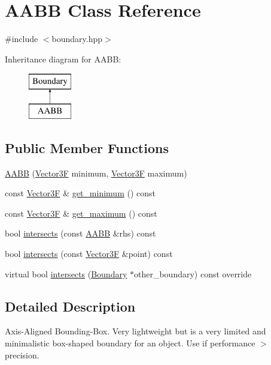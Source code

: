 \hypertarget{class_a_a_b_b}{}\section{A\+A\+BB Class Reference}
\label{class_a_a_b_b}


{\ttfamily \#include $<$boundary.\+hpp$>$}

Inheritance diagram for A\+A\+BB\+:\begin{figure}[H]
\begin{center}
\leavevmode
\includegraphics[height=2.000000cm]{class_a_a_b_b}
\end{center}
\end{figure}
\subsection*{Public Member Functions}
\begin{DoxyCompactItemize}
\item 
\mbox{\hyperlink{class_a_a_b_b_a12dd0a1fb58f12ee747de9783fcc159f}{A\+A\+BB}} (\mbox{\hyperlink{class_vector3}{Vector3F}} minimum, \mbox{\hyperlink{class_vector3}{Vector3F}} maximum)
\item 
const \mbox{\hyperlink{class_vector3}{Vector3F}} \& \mbox{\hyperlink{class_a_a_b_b_a4d2bc2fc98412ad6160c4104f0aeb983}{get\+\_\+minimum}} () const
\item 
const \mbox{\hyperlink{class_vector3}{Vector3F}} \& \mbox{\hyperlink{class_a_a_b_b_a79e383c8e3010cdd1134aca704de030b}{get\+\_\+maximum}} () const
\item 
bool \mbox{\hyperlink{class_a_a_b_b_a9c1cca9c55355340fffd6b4f707dd70d}{intersects}} (const \mbox{\hyperlink{class_a_a_b_b}{A\+A\+BB}} \&rhs) const
\item 
bool \mbox{\hyperlink{class_a_a_b_b_ad517489d4c7a73d99ca28b126283daf0}{intersects}} (const \mbox{\hyperlink{class_vector3}{Vector3F}} \&point) const
\item 
virtual bool \mbox{\hyperlink{class_a_a_b_b_ab427a4455732a16802103e06ed4af02a}{intersects}} (\mbox{\hyperlink{class_boundary}{Boundary}} $\ast$other\+\_\+boundary) const override
\end{DoxyCompactItemize}


\subsection{Detailed Description}
Axis-\/\+Aligned Bounding-\/\+Box. Very lightweight but is a very limited and minimalistic box-\/shaped boundary for an object. Use if performance $>$ precision. 

